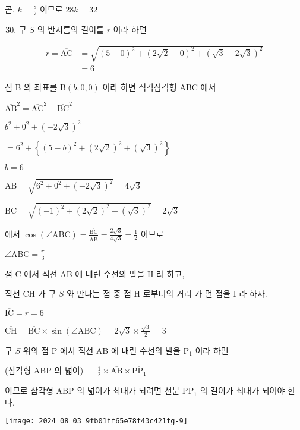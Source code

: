 \documentclass[10pt]{article}
\begin{document}
곧, \(k=\frac{8}{7}\) 이므로 \(28 k=32\)

\begin{enumerate}
  \setcounter{enumi}{29}
  \item 구 \(S\) 의 반지름의 길이를 \(r\) 이라 하면
\end{enumerate}

\[
\begin{aligned}
r=\overline{\mathrm{AC}} & =\sqrt{(5-0)^{2}+(2 \sqrt{2}-0)^{2}+(\sqrt{3}-2 \sqrt{3})^{2}} \\
& =6
\end{aligned}
\]

점 B 의 좌표를 \(\mathrm{B}(b, 0,0)\) 이라 하면 직각삼각형 ABC 에서

\(\overline{\mathrm{AB}}^{2}=\overline{\mathrm{AC}}^{2}+\overline{\mathrm{BC}}^{2}\)

\(b^{2}+0^{2}+(-2 \sqrt{3})^{2}\)

\(=6^{2}+\left\{(5-b)^{2}+(2 \sqrt{2})^{2}+(\sqrt{3})^{2}\right\}\)

\(b=6\)

\(\overline{\mathrm{AB}}=\sqrt{6^{2}+0^{2}+(-2 \sqrt{3})^{2}}=4 \sqrt{3}\)

\(\overline{\mathrm{BC}}=\sqrt{(-1)^{2}+(2 \sqrt{2})^{2}+(\sqrt{3})^{2}}=2 \sqrt{3}\)

에서 \(\cos (\angle \mathrm{ABC})=\frac{\overline{\mathrm{BC}}}{\overline{\mathrm{AB}}}=\frac{2 \sqrt{3}}{4 \sqrt{3}}=\frac{1}{2}\) 이므로

\(\angle \mathrm{ABC}=\frac{\pi}{3}\)

점 C 에서 직선 AB 에 내린 수선의 발을 H 라 하고,

직선 CH 가 구 \(S\) 와 만나는 점 중 점 H 로부터의 거리 가 먼 점을 I 라 하자.

\(\overline{\mathrm{IC}}=r=6\)

\(\overline{\mathrm{CH}}=\overline{\mathrm{BC}} \times \sin (\angle \mathrm{ABC})=2 \sqrt{3} \times \frac{\sqrt{3}}{2}=3\)

구 \(S\) 위의 점 P 에서 직선 AB 에 내린 수선의 발을 \(\mathrm{P}_{1}\) 이라 하면

(삼각형 ABP 의 넓이) \(=\frac{1}{2} \times \overline{\mathrm{AB}} \times \overline{\mathrm{PP}_{1}}\)

이므로 삼각형 ABP 의 넓이가 최대가 되려면 선분 \(\mathrm{PP}_{1}\) 의 길이가 최대가 되어야 한다.

\begin{center}
\texttt{[image: 2024\_08\_03\_9fb01ff65e78f43c421fg-9]}
\end{center}
\end{document}

